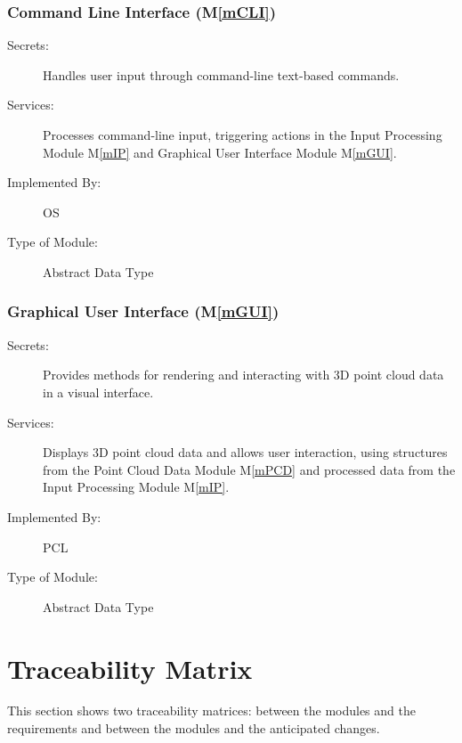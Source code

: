 \documentclass[12pt, titlepage]{article}
\newcommand{\mref}[1]{M\ref{#1}}
\begin{document}
\subsubsection{Command Line Interface (\mref{mCLI})}

\begin{description}
\item[Secrets:] Handles user input through command-line text-based commands.
\item[Services:] Processes command-line input, triggering actions in the Input Processing Module \mref{mIP}
  and Graphical User Interface Module \mref{mGUI}.
\item[Implemented By:] OS
\item[Type of Module:] Abstract Data Type
\end{description}

\subsubsection{Graphical User Interface (\mref{mGUI})}

\begin{description}
\item[Secrets:] Provides methods for rendering and interacting with 3D point cloud data in a visual interface.
\item[Services:] Displays 3D point cloud data and allows user interaction, using structures from the Point Cloud Data Module \mref{mPCD} 
  and processed data from the Input Processing Module \mref{mIP}.
\item[Implemented By:] PCL
\item[Type of Module:] Abstract Data Type
\end{description}

\section{Traceability Matrix} \label{SecTM}

This section shows two traceability matrices: between the modules and the
requirements and between the modules and the anticipated changes.
\end{document}
